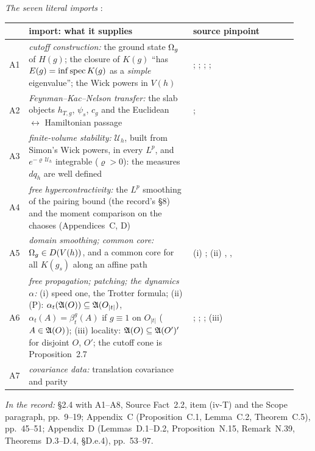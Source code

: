 \emph{The seven literal imports} :

\begin{center}
\footnotesize
\setlength{\tabcolsep}{4pt}
\begin{tabular}{@{}>{\raggedright\arraybackslash}p{0.04\linewidth}
                >{\raggedright\arraybackslash}p{0.55\linewidth}
                >{\raggedright\arraybackslash}p{0.35\linewidth}@{}}
\toprule
& import: what it supplies & source pinpoint\\
\midrule
A1 & \emph{cutoff construction:} the ground state $\Omega_g$ of $H(g)$; the closure of $K(g)$
``has $E(g)=\inf\operatorname{spec} K(g)$ as a \emph{simple} eigenvalue''; the Wick powers in $V(h)$ &
\cite[p.~588]{GJS}; \cite[Thms.~2.2.1, 2.3.1]{GJ2}; \cite{GJ71}; \cite[Thm.~5.3]{Rosen70};
\cite[pp.~10--12, 15--17, 134--138]{SimonBook}\\
A2 & \emph{Feynman--Kac--Nelson transfer:} the slab objects $h_{T,g}$, $\psi_s$, $c_g$
and the Euclidean $\leftrightarrow$ Hamiltonian passage &
\cite[Thm.~III.6, Cor.~V.14, Thm.~V.15]{SimonBook}; \cite[Thms.~II.14, II.16]{GRS75}\\
A3 & \emph{finite-volume stability:} $\mathcal U_h$, built from Simon's Wick powers, in
every $L^p$, and $e^{-\varrho\,\mathcal U_h}$ integrable ($\varrho>0$): the measures
$dq_h$ are well defined &
\cite[pp.~135--137; Thm.~V.2(a), p.~137; Thm.~V.7(a), p.~152]{SimonBook}\\
A4 & \emph{free hypercontractivity:} the $L^p$ smoothing of the pairing bound (the
record's \S8) and the moment comparison on the chaoses (Appendices~C, D) &
\cite[Thms.~I.17, I.22, III.17]{SimonBook}\\
A5 & \emph{domain smoothing; common core:} $\Omega_g\in D(V(h))$, and a common core for all
$K(g_s)$ along an affine path & (i) \cite[Ch.~7, Thm.~7.4]{GJExp}; (ii)
\cite[Thm.~V.12]{SimonBook}, \cite[Thm.~5.3]{Rosen70}, \cite{GJ2}\\
A6 & \emph{free propagation; patching; the dynamics $\alpha$:} (i) speed one, the
Trotter formula; (ii) (P): $\alpha_t(\mathfrak{A}(O))\subseteq\mathfrak{A}(O_{|t|})$,
$\alpha_t(A)=\beta^g_t(A)$ if $g\equiv1$ on $O_{|t|}$ ($A\in\mathfrak{A}(O)$); (iii) locality:
$\mathfrak{A}(O)\subseteq\mathfrak{A}(O')'$ for disjoint $O$, $O'$; the cutoff cone is Proposition~2.7 &
\cite[\S III]{GJ1}; \cite[\S\S3.5--3.6]{GJ2}; \cite[\S4.1 and Ch.~4]{GJExp};
(iii) \cite[p.~397]{GJ2}\\
A7 & \emph{covariance data:} translation covariance and parity & \cite[p.~398]{GJ2}\\
\bottomrule
\end{tabular}
\end{center}

\noindent\emph{In the record:} \S2.4 with A1--A8, Source Fact~2.2, item (iv-T) and the
Scope paragraph, pp.~9--19; Appendix~C (Proposition~C.1, Lemma~C.2, Theorem~C.5),
pp.~45--51; Appendix~D (Lemmas~D.1--D.2, Proposition~N.15, Remark~N.39, Theorems~D.3--D.4,
\S D.e.4), pp.~53--97.
